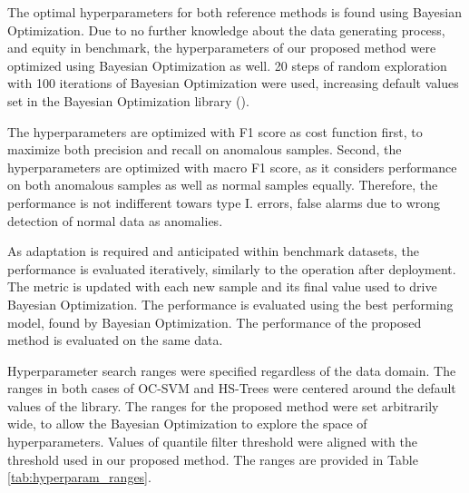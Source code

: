 The optimal hyperparameters for both reference methods is found using Bayesian Optimization. Due to no further knowledge about the data generating process, and equity in benchmark, the hyperparameters of our proposed method were optimized using Bayesian Optimization as well. 20 steps of random exploration with 100 iterations of Bayesian Optimization were used, increasing default values set in the Bayesian Optimization library (\cite{Nogueira2014}).

The hyperparameters are optimized with F1 score as cost function first, to maximize both precision and recall on anomalous samples. Second, the hyperparameters are optimized with macro F1 score, as it considers performance on both anomalous samples as well as normal samples equally. Therefore, the performance is not indifferent towars type I. errors, false alarms due to wrong detection of normal data as anomalies.

As adaptation is required and anticipated within benchmark datasets, the performance is evaluated iteratively, similarly to the operation after deployment. The metric is updated with each new sample and its final value used to drive Bayesian Optimization. The performance is evaluated using the best performing model, found by Bayesian Optimization. The performance of the proposed method is evaluated on the same data.

Hyperparameter search ranges were specified regardless of the data domain. The ranges in both cases of OC-SVM and HS-Trees were centered around the default values of the library. The ranges for the proposed method were set arbitrarily wide, to allow the Bayesian Optimization to explore the space of hyperparameters. Values of quantile filter threshold were aligned with the threshold used in our proposed method. The ranges are provided in Table \ref{tab:hyperparam_ranges}.

